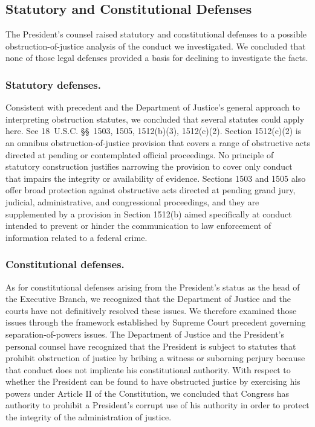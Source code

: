 \subsection{Statutory and Constitutional Defenses}

The President’s counsel raised statutory and constitutional defenses to a possible obstruction-of-justice analysis of the conduct we investigated.
We concluded that none of those legal defenses provided a basis for declining to investigate the facts.

\subsubsection*{Statutory defenses.}

Consistent with precedent and the Department of Justice’s general approach to interpreting obstruction statutes, we concluded that several statutes could apply here.
See 18~U.S.C. \S\S~1503, 1505, 1512(b)(3), 1512(c)(2).
Section 1512(c)(2) is an omnibus obstruction-of-justice provision that covers a range of obstructive acts directed at pending or contemplated official proceedings.
No principle of statutory construction justifies narrowing the provision to cover only conduct that impairs the integrity or availability of evidence.
Sections 1503 and 1505 also offer broad protection against obstructive acts directed at pending grand jury, judicial, administrative, and congressional proceedings, and they are supplemented by a provision in Section 1512(b) aimed specifically at conduct intended to prevent or hinder the communication to law enforcement of information related to a federal crime.

\subsubsection*{Constitutional defenses.}

As for constitutional defenses arising from the President’s status as the head of the Executive Branch, we recognized that the Department of Justice and the courts have not definitively resolved these issues.
We therefore examined those issues through the framework established by Supreme Court precedent governing separation-of-powers issues.
The Department of Justice and the President’s personal counsel have recognized that the President is subject to statutes that prohibit obstruction of justice by bribing a witness or suborning perjury because that conduct does not implicate his constitutional authority.
With respect to whether the President can be found to have obstructed justice by exercising his powers under Article II of the Constitution, we concluded that Congress has authority to prohibit a President’s corrupt use of his authority in order to protect the integrity of the administration of justice.

